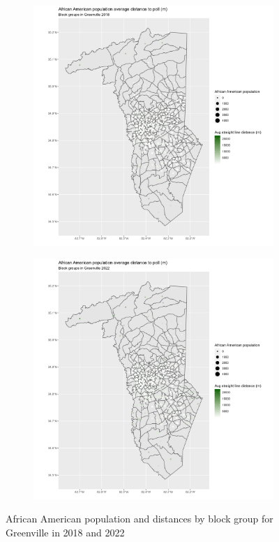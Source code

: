 \documentclass[11pt]{article}
\theoremstyle{remark}
\theoremstyle{definition}
\begin{document}
\begin{figure}
	\begin{subfigure}{.5\textwidth}
		\centering
		\includegraphics[width=\linewidth]{result_analysis/Greenville_SC_original_configs/black_pop_and_dist_Greenville_config_original_2018_polls.png}
		\label{sfig:York_2018_bg_dist_pop}
	\end{subfigure}
	\begin{subfigure}{.5\textwidth}
		\centering
		\includegraphics[width=\linewidth]{result_analysis/Greenville_SC_original_configs/black_pop_and_dist_Greenville_config_original_2022_polls.png}
		\label{sfig:Greenville_2022_bg_dist}
	\end{subfigure}
	\caption{African American population and distances by block group for Greenville in 2018 and 2022}
	\label{fig:Greenville distance Black population maps}
\end{figure}
\end{document}
